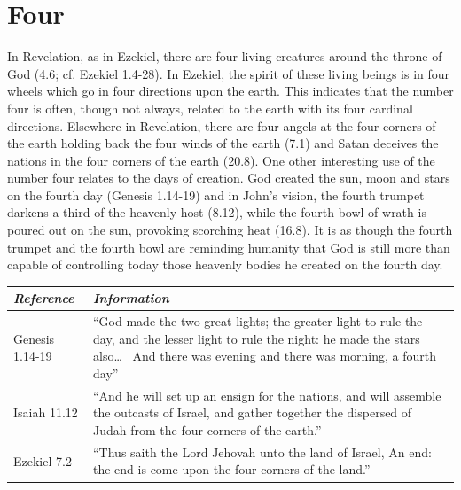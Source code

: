\section*{Four}
In Revelation, as in Ezekiel, there are four living creatures around the throne of God (4.6; cf. Ezekiel 1.4-28). In Ezekiel, the spirit of these living beings is in four wheels which go in four directions upon the earth. This indicates that the number four is often, though not always, related to the earth with its four cardinal directions.
Elsewhere in Revelation, there are four angels at the four corners of the earth holding back the four winds of the earth (7.1) and Satan deceives the nations in the four corners of the earth (20.8). 
\newline\newline
One other interesting use of the number four relates to the days of creation. God created the sun, moon and stars on the fourth day (Genesis 1.14-19) and in John's vision, the fourth trumpet darkens a third of the heavenly host (8.12), while the fourth bowl of wrath is poured out on the sun, provoking scorching heat (16.8). It is as though the fourth trumpet and the fourth bowl are reminding humanity that God is still more than capable of controlling today those heavenly bodies he created on the fourth day.
\newline\newline
\begin{tabularx}{\textwidth}{l X}
\toprule
\rowcolor{headergray}\emph{Reference} & \emph{Information}\\ 
\midrule
Genesis 1.14-19 & ``God made the two great lights; the greater light to rule the day, and the lesser light to rule the night: he made the stars also\ldots~ And there was evening and there was morning, a fourth day'' \\
\addlinespace
Isaiah 11.12 & ``And he will set up an ensign for the nations, and will assemble the outcasts of Israel, and gather together the dispersed of Judah from the four corners of the earth.'' \\
\addlinespace
Ezekiel 7.2 & ``Thus saith the Lord Jehovah unto the land of Israel, An end: the end is come upon the four corners of the land.'' \\
\bottomrule
\end{tabularx}

